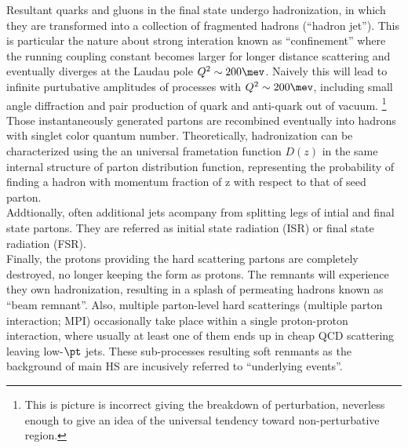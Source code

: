 Resultant quarks and gluons in the final state undergo hadronization, in which they are transformed into a collection of fragmented hadrons (``hadron jet''). This is particular the nature about strong interation known as ``confinement'' where the running coupling constant becomes larger for longer distance scattering and eventually diverges at the Laudau pole $Q^2\sim 200\mev$. Naively this will lead to infinite purtubative amplitudes of processes with $Q^2\sim 200\mev$, including small angle diffraction and pair production of quark and anti-quark out of vacuum. 
\footnote{This is picture is incorrect giving the breakdown of perturbation, neverless enough to give an idea of the universal tendency toward non-perturbative region.}
Those instantaneously generated partons are recombined eventually into hadrons with singlet color quantum number. Theoretically, hadronization can be characterized using the an universal frametation function $D(z)$ in the same internal structure of parton distribution function, representing the probability of finding a hadron with momentum fraction of z with respect to that of seed parton. \\

Addtionally, often additional jets acompany from splitting legs of intial and final state partons. 
They are referred as initial state radiation (ISR) or final state radiation (FSR). \\

Finally, the protons providing the hard scattering partons are completely destroyed, no longer keeping the form as protons.
The remnants will experience they own hadronization, resulting in a splash of permeating hadrons known as ``beam remnant''.
Also, multiple parton-level hard scatterings (multiple parton interaction; MPI) occasionally take place within a single proton-proton interaction, where usually at least one of them ends up in cheap QCD scattering leaving low-$\pt$ jets.
These sub-processes resulting soft renmants as the background of main HS are incusively referred to ``underlying events''.




